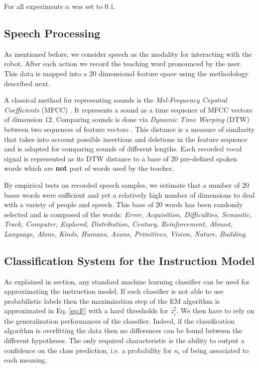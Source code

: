 For all experiments $\alpha$ was set to $0.1$.

\subsection{Speech Processing}

As mentioned before, we consider speech as the modality for interacting with the robot. After each action we record the teaching word pronounced by the user. This data is mapped into a $20$ dimensional feature space using the methodology described next.  

A classical method for representing sounds is the \textit{Mel-Frequency Cepstral Coefficients} (MFCC) \cite{zheng2001comparison}. It represents a sound as a time sequence of MFCC vectors of dimension $12$. Comparing sounds is done via \textit{Dynamic Time Warping} (DTW) between two sequences of feature vectors \cite{sakoe1978dynamic}. This distance is a measure of similarity that takes into account possible insertions and deletions in the feature sequence and is adapted for comparing sounds of different lengths. Each recorded vocal signal is represented as its DTW distance to a base of 20 pre-defined spoken words which are \textbf{not} part of words used by the teacher.

By empirical tests on recorded speech samples, we estimate that a number of 20 bases words were sufficient and yet a relatively high number of dimensions to deal with a variety of people and speech. This base of 20 words has been randomly selected and is composed of the words:\emph{ \footnotesize{Error, Acquisition, Difficulties, Semantic, Track, Computer, Explored, Distribution, Century, Reinforcement, Almost, Language, Alone, Kinds, Humans, Axons, Primitives, Vision, Nature, Building}}.


\subsection{Classification System for the Instruction Model}

As explained in section, any standard machine learning classifier can be used for approximating the instruction model. If such classifier is not able to use probabilistic labels then the maximization step of the EM algorithm is approximated in Eq. \ref{eq:F} with a hard thresholds for $z_i^{\xi}$. We then have to rely on the generalization performances of the classifier. Indeed, if the classification algorithm is overfitting the data then no differences can be found between the different hypotheses. The only required characteristic is the ability to output a confidence on the class prediction, i.e. a probability for $n_i$ of being associated to each meaning.

